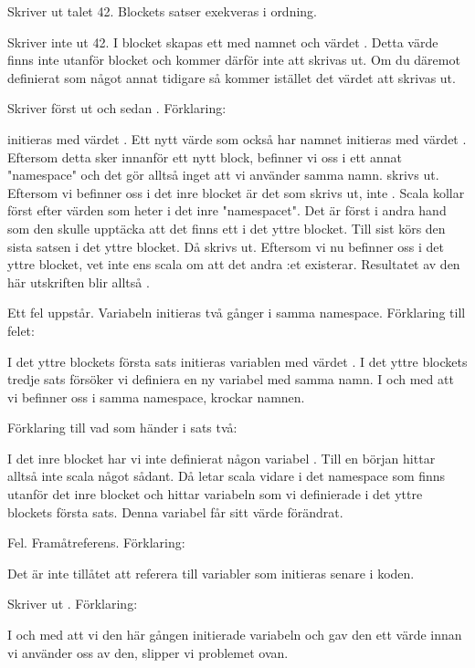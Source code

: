 \Subtask Skriver ut talet 42. Blockets satser exekveras i ordning. 

\Subtask Skriver inte ut 42. I blocket skapas ett  med namnet  och värdet . Detta värde finns inte utanför blocket och kommer därför inte att skrivas ut. Om du däremot definierat  som något annat tidigare så kommer istället det värdet att skrivas ut.

\Subtask Skriver först ut  och sedan . Förklaring:

 initieras med värdet . Ett nytt värde som också har namnet  initieras med värdet . Eftersom detta sker innanför ett nytt block, befinner vi oss i ett annat "namespace" och det gör alltså inget att vi använder samma namn.  skrivs ut. Eftersom vi befinner oss i det inre blocket är det  som skrivs ut, inte . Scala kollar först efter värden som heter  i det inre "namespacet". Det är först i andra hand som den skulle upptäcka att det finns ett  i det yttre blocket. Till sist körs den sista satsen i det yttre blocket. Då skrivs  ut. Eftersom vi nu befinner oss i det yttre blocket, vet inte ens scala om att det andra :et existerar. Resultatet av den här utskriften blir alltså .

\Subtask Ett fel uppstår. Variabeln  initieras två gånger i samma namespace. Förklaring till felet:

I det yttre blockets första sats initieras variablen  med värdet . I det yttre blockets tredje sats försöker vi definiera en ny variabel med samma namn. I och med att vi befinner oss i samma namespace, krockar namnen.

Förklaring till vad som händer i sats två:

I det inre blocket har vi inte definierat någon variabel . Till en början hittar alltså inte scala något sådant. Då letar scala vidare i det namespace som finns utanför det inre blocket och hittar variabeln som vi definierade i det yttre blockets första sats. Denna variabel får sitt värde förändrat.

\Subtask Fel. Framåtreferens. Förklaring:

Det är inte tillåtet att referera till variabler som initieras senare i koden.

\Subtask Skriver ut . Förklaring:

I och med att vi den här gången initierade variabeln  och gav den ett värde innan vi använder oss av den, slipper vi problemet ovan.

